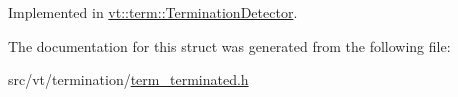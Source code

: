 Implemented in \hyperlink{structvt_1_1term_1_1_termination_detector_a1d3cebd2600b5a3900dd9954de55cf35}{vt\+::term\+::\+Termination\+Detector}.



The documentation for this struct was generated from the following file\+:\begin{DoxyCompactItemize}
\item 
src/vt/termination/\hyperlink{term__terminated_8h}{term\+\_\+terminated.\+h}\end{DoxyCompactItemize}
